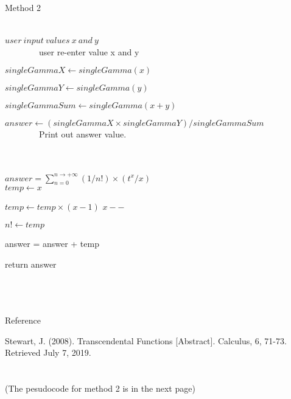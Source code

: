 \documentclass{article} \usepackage{mathtools} \usepackage{algorithm}
\begin{document}
\begin{algorithm} 
\caption{Method 2}
\label{euclid} 
\begin{algorithmic}[2] 

 \\
$user \ input \ values \  x \ and \  y$ \ 
 \\
\ \ \ \ \ \ \ \ user re-enter value x and y \\
\EndWhile

\State $singleGammaX\gets singleGamma(x)$ 

\State $singleGammaY\gets singleGamma(y)$ 

\State $singleGammaSum\gets singleGamma(x + y)$ 

\State $answer \gets( singleGammaX \times singleGammaY ) / singleGammaSum$  \\

\ \ \ \ \ \ \ \ Print out answer value.

\EndProcedure  \\ 
 \\
$answer = \sum_{n=0}^{n \to +\infty}( 1/n!) \times( t^x / x) $\\

\State $temp \gets x $

\State $temp\gets temp \times (x-1)$ 
\State $ x--$ 
\EndWhile


\State $n! \gets temp$


\State answer = answer + temp
\EndWhile

\State return answer

\EndProcedure 
\end{algorithmic}


\end{algorithm} 
\\
\\
\\

{\large Reference}

Stewart, J. (2008). Transcendental Functions [Abstract]. Calculus, 6, 71-73. Retrieved July 7, 2019.
\\ \\ \\ 
(The pesudocode for method 2 is in the next page)
\end{document}
